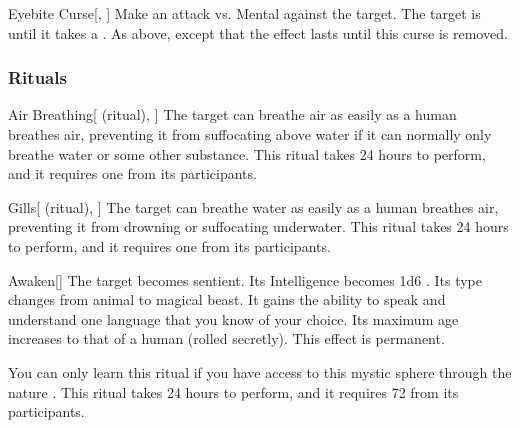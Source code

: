 \lowercase{\hypertarget{spell:Eyebite Curse}{}}\label{spell:Eyebite Curse}
\begin{freeability}[Rank 8]{\hypertarget{spell:Eyebite Curse}{Eyebite Curse}}[, ]
Make an attack vs. Mental against the target.
\hit The target is  until it takes a .
\crit As above, except that the effect lasts until this curse is removed.

\end{freeability}
\vspace{0.25em}



\subsubsection{Rituals}


\lowercase{\hypertarget{spell:Air Breathing}{}}\label{spell:Air Breathing}
\begin{attuneability}[Rank 3]{\hypertarget{spell:Air Breathing}{Air Breathing}}[ (ritual), ]
The target can breathe air as easily as a human breathes air, preventing it from suffocating above water if it can normally only breathe water or some other substance.
This ritual takes 24 hours to perform, and it requires one  from its participants.
\end{attuneability}
\vspace{0.25em}



\lowercase{\hypertarget{spell:Gills}{}}\label{spell:Gills}
\begin{attuneability}[Rank 3]{\hypertarget{spell:Gills}{Gills}}[ (ritual), ]
The target can breathe water as easily as a human breathes air, preventing it from drowning or suffocating underwater.
This ritual takes 24 hours to perform, and it requires one  from its participants.
\end{attuneability}
\vspace{0.25em}



\lowercase{\hypertarget{spell:Awaken}{}}\label{spell:Awaken}
\begin{freeability}[Rank 6]{\hypertarget{spell:Awaken}{Awaken}}[]
The target becomes sentient.
Its Intelligence becomes 1d6 .
Its type changes from animal to magical beast.
It gains the ability to speak and understand one language that you know of your choice.
Its maximum age increases to that of a human (rolled secretly).
This effect is permanent.

You can only learn this ritual if you have access to this mystic sphere through the nature .
This ritual takes 24 hours to perform, and it requires 72  from its participants.
\end{freeability}
\vspace{0.25em}


